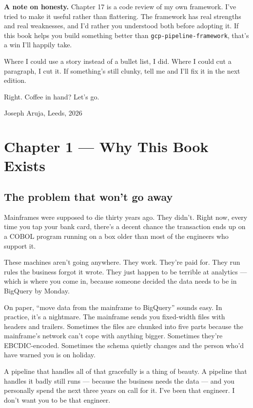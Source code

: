 \documentclass[
  11pt,
  british,
  oneside]{book}
\begin{document}
\textbf{A note on honesty.} Chapter 17 is a code review of my own
framework. I've tried to make it useful rather than flattering. The
framework has real strengths and real weaknesses, and I'd rather you
understood both before adopting it. If this book helps you build
something better than \texttt{gcp-pipeline-framework}, that's a win I'll
happily take.

Where I could use a story instead of a bullet list, I did. Where I could
cut a paragraph, I cut it. If something's still clunky, tell me and I'll
fix it in the next edition.

Right. Coffee in hand? Let's go.

Joseph Aruja, Leeds, 2026

\newpage

\hypertarget{chapter-1-why-this-book-exists}{%
\chapter{Chapter 1 --- Why This Book
Exists}\label{chapter-1-why-this-book-exists}}

\hypertarget{the-problem-that-wont-go-away}{%
\section{The problem that won't go
away}\label{the-problem-that-wont-go-away}}

Mainframes were supposed to die thirty years ago. They didn't. Right
now, every time you tap your bank card, there's a decent chance the
transaction ends up on a COBOL program running on a box older than most
of the engineers who support it.

These machines aren't going anywhere. They work. They're paid for. They
run rules the business forgot it wrote. They just happen to be terrible
at analytics --- which is where you come in, because someone decided the
data needs to be in BigQuery by Monday.

On paper, ``move data from the mainframe to BigQuery'' sounds easy. In
practice, it's a nightmare. The mainframe sends you fixed-width files
with headers and trailers. Sometimes the files are chunked into five
parts because the mainframe's network can't cope with anything bigger.
Sometimes they're EBCDIC-encoded. Sometimes the schema quietly changes
and the person who'd have warned you is on holiday.

A pipeline that handles all of that gracefully is a thing of beauty. A
pipeline that handles it badly still runs --- because the business needs
the data --- and you personally spend the next three years on call for
it. I've been that engineer. I don't want you to be that engineer.
\end{document}
